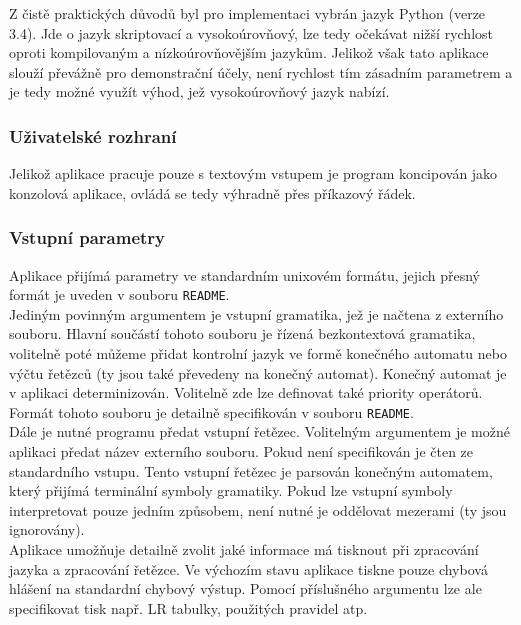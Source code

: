 Z čistě praktických důvodů byl pro implementaci vybrán jazyk Python
(verze 3.4). Jde o jazyk skriptovací a vysokoúrovňový, lze tedy
očekávat nižší rychlost oproti kompilovaným a nízkoúrovňovějším jazykům.
Jelikož však tato aplikace slouží převážně pro demonstrační účely,
není rychlost tím zásadním parametrem a je tedy možné využít
výhod, jež vysokoúrovňový jazyk nabízí.

\subsubsection*{Uživatelské rozhraní}

Jelikož aplikace pracuje pouze s textovým vstupem je program koncipován
jako konzolová aplikace, ovládá se tedy výhradně přes příkazový řádek.

\subsubsection*{Vstupní parametry}

Aplikace přijímá parametry ve standardním unixovém formátu, jejich přesný
formát je uveden v souboru \texttt{README}.\\

Jediným povinným argumentem je vstupní gramatika, jež je načtena z
externího souboru. Hlavní součástí tohoto souboru je řízená bezkontextová gramatika,
volitelně poté můžeme přidat kontrolní jazyk ve formě konečného automatu nebo
výčtu řetězců (ty jsou také převedeny na konečný automat). Konečný
automat je v aplikaci determinizován.
Volitelně zde lze definovat také priority operátorů.
Formát tohoto souboru je detailně specifikován v souboru \texttt{README}.\\

Dále je nutné programu předat vstupní řetězec. Volitelným argumentem je
možné aplikaci předat název externího souboru. Pokud není specifikován
je čten ze standardního vstupu. Tento vstupní řetězec je parsován konečným
automatem, který přijímá terminální symboly gramatiky.
Pokud lze vstupní symboly interpretovat pouze jedním způsobem, není nutné
je oddělovat mezerami (ty jsou ignorovány).\\

Aplikace umožňuje detailně zvolit jaké informace má tisknout
při zpracování jazyka a zpracování řetězce. Ve výchozím stavu
aplikace tiskne pouze chybová hlášení na standardní chybový výstup.
Pomocí příslušného argumentu lze ale specifikovat tisk např. LR tabulky,
použitých pravidel atp.\\

